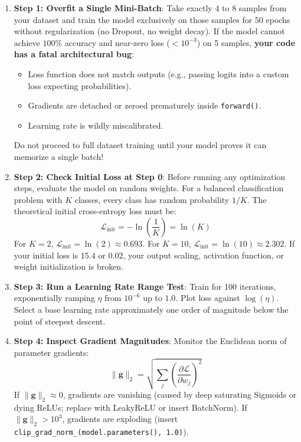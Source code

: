 \begin{enumerate}
    \item \textbf{Step 1: Overfit a Single Mini-Batch}: Take exactly 4 to 8 samples from your dataset and train the model exclusively on those samples for 50 epochs without regularization (no Dropout, no weight decay). If the model cannot achieve $100\%$ accuracy and near-zero loss ($< 10^{-3}$) on 5 samples, \textbf{your code has a fatal architectural bug}:
    \begin{itemize}
        \item Loss function does not match outputs (e.g., passing logits into a custom loss expecting probabilities).
        \item Gradients are detached or zeroed prematurely inside \texttt{forward()}.
        \item Learning rate is wildly miscalibrated.
    \end{itemize}
    Do not proceed to full dataset training until your model proves it can memorize a single batch!
    
    \item \textbf{Step 2: Check Initial Loss at Step 0}: Before running any optimization steps, evaluate the model on random weights. For a balanced classification problem with $K$ classes, every class has random probability $1 / K$. The theoretical initial cross-entropy loss must be:
    \begin{equation}
    \mathcal{L}_{\text{init}} = -\ln\left(\frac{1}{K}\right) = \ln(K)\label{eq:initial_loss_rule}
    \end{equation}
    For $K = 2$, $\mathcal{L}_{\text{init}} = \ln(2) \approx 0.693$. For $K = 10$, $\mathcal{L}_{\text{init}} = \ln(10) \approx 2.302$. If your initial loss is $15.4$ or $0.02$, your output scaling, activation function, or weight initialization is broken.
    
    \item \textbf{Step 3: Run a Learning Rate Range Test}: Train for 100 iterations, exponentially ramping $\eta$ from $10^{-6}$ up to $1.0$. Plot loss against $\log(\eta)$. Select a base learning rate approximately one order of magnitude below the point of steepest descent.
    
    \item \textbf{Step 4: Inspect Gradient Magnitudes}: Monitor the Euclidean norm of parameter gradients:
    \begin{equation}
    \|\mathbf{g}\|_2 = \sqrt{\sum_j \left(\frac{\partial \mathcal{L}}{\partial w_j}\right)^2}\label{eq:grad_norm}
    \end{equation}
    If $\|\mathbf{g}\|_2 \approx 0$, gradients are vanishing (caused by deep saturating Sigmoids or dying ReLUs; replace with LeakyReLU or insert BatchNorm). If $\|\mathbf{g}\|_2 > 10^3$, gradients are exploding (insert \texttt{clip\_grad\_norm\_(model.parameters(), 1.0)}).
    

\end{enumerate}
